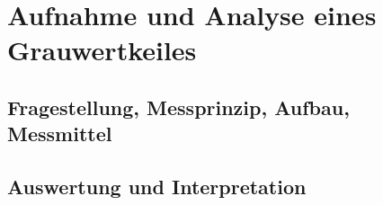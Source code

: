 %
%
\chapter{Aufnahme und Analyse eines Grauwertkeiles}
\label{chap:VERSUCH_1}

\section{Fragestellung, Messprinzip, Aufbau, Messmittel}
\label{chap:VERSUCH_1_FRAGESTELLUNG}


\section{Auswertung und Interpretation}
\label{chap:VERSUCH_1_AUSWERTUNG}
